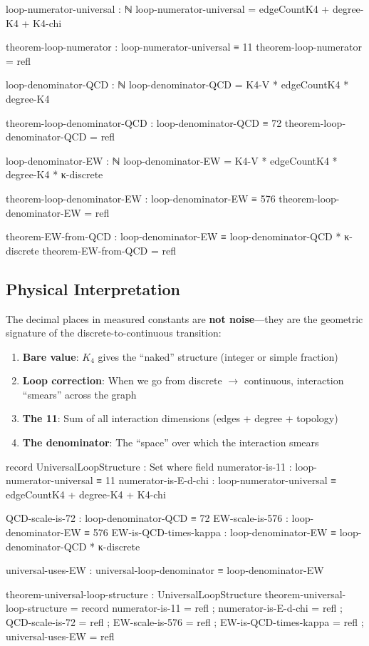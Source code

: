 \documentclass[11pt,a4paper]{book}
\begin{document}
\begin{code}
loop-numerator-universal : ℕ
loop-numerator-universal = edgeCountK4 + degree-K4 + K4-chi

theorem-loop-numerator : loop-numerator-universal ≡ 11
theorem-loop-numerator = refl

loop-denominator-QCD : ℕ
loop-denominator-QCD = K4-V * edgeCountK4 * degree-K4

theorem-loop-denominator-QCD : loop-denominator-QCD ≡ 72
theorem-loop-denominator-QCD = refl

loop-denominator-EW : ℕ
loop-denominator-EW = K4-V * edgeCountK4 * degree-K4 * κ-discrete

theorem-loop-denominator-EW : loop-denominator-EW ≡ 576
theorem-loop-denominator-EW = refl

theorem-EW-from-QCD : loop-denominator-EW ≡ loop-denominator-QCD * κ-discrete
theorem-EW-from-QCD = refl
\end{code}

\subsection{Physical Interpretation}

The decimal places in measured constants are \textbf{not noise}---they are the geometric signature of the discrete-to-continuous transition:

\begin{enumerate}
\item \textbf{Bare value}: $K_4$ gives the ``naked'' structure (integer or simple fraction)
\item \textbf{Loop correction}: When we go from discrete $\to$ continuous, interaction ``smears'' across the graph
\item \textbf{The 11}: Sum of all interaction dimensions (edges + degree + topology)
\item \textbf{The denominator}: The ``space'' over which the interaction smears
\end{enumerate}

\begin{code}
record UniversalLoopStructure : Set where
  field
    numerator-is-11 : loop-numerator-universal ≡ 11
    numerator-is-E-d-chi : loop-numerator-universal ≡ edgeCountK4 + degree-K4 + K4-chi
    
    QCD-scale-is-72 : loop-denominator-QCD ≡ 72
    EW-scale-is-576 : loop-denominator-EW ≡ 576
    EW-is-QCD-times-kappa : loop-denominator-EW ≡ loop-denominator-QCD * κ-discrete
    
    universal-uses-EW : universal-loop-denominator ≡ loop-denominator-EW

theorem-universal-loop-structure : UniversalLoopStructure
theorem-universal-loop-structure = record
  { numerator-is-11 = refl
  ; numerator-is-E-d-chi = refl
  ; QCD-scale-is-72 = refl
  ; EW-scale-is-576 = refl
  ; EW-is-QCD-times-kappa = refl
  ; universal-uses-EW = refl
  }
\end{code}
\end{document}
